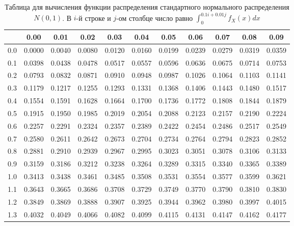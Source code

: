 \documentclass[12pt]{article}
\begin{document}
\begin{center}
  \begin{table}
    \caption{Таблица для вычисления функции распределения стандартного нормального распределения $N(0, 1)$. В $i$-й строке и $j$-ом столбце число равно $\int_0^{0.1i+ 0.01j} f_X(x) dx $}
    \begin{tabular}{|c||c|c|c|c|c|c|c|c|c|c|}
      \hline
      & 0.00 & 0.01 & 0.02 & 0.03 & 0.04 & 0.05 & 0.06 & 0.07 & 0.08 & 0.09 \\ \hline\hline
      0.0 & 0.0000 & 0.0040 & 0.0080 & 0.0120 & 0.0160 & 0.0199 & 0.0239 & 0.0279 & 0.0319 & 0.0359 \\ \hline
      0.1 & 0.0398 & 0.0438 & 0.0478 & 0.0517 & 0.0557 & 0.0596 & 0.0636 & 0.0675 & 0.0714 & 0.0753 \\ \hline
      0.2 & 0.0793 & 0.0832 & 0.0871 & 0.0910 & 0.0948 & 0.0987 & 0.1026 & 0.1064 & 0.1103 & 0.1141 \\ \hline
      0.3 & 0.1179 & 0.1217 & 0.1255 & 0.1293 & 0.1331 & 0.1368 & 0.1406 & 0.1443 & 0.1480 & 0.1517 \\ \hline
      0.4 & 0.1554 & 0.1591 & 0.1628 & 0.1664 & 0.1700 & 0.1736 & 0.1772 & 0.1808 & 0.1844 & 0.1879 \\ \hline
      0.5 & 0.1915 & 0.1950 & 0.1985 & 0.2019 & 0.2054 & 0.2088 & 0.2123 & 0.2157 & 0.2190 & 0.2224 \\ \hline
      0.6 & 0.2257 & 0.2291 & 0.2324 & 0.2357 & 0.2389 & 0.2422 & 0.2454 & 0.2486 & 0.2517 & 0.2549 \\ \hline
      0.7 & 0.2580 & 0.2611 & 0.2642 & 0.2673 & 0.2704 & 0.2734 & 0.2764 & 0.2794 & 0.2823 & 0.2852 \\ \hline
      0.8 & 0.2881 & 0.2910 & 0.2939 & 0.2967 & 0.2995 & 0.3023 & 0.3051 & 0.3078 & 0.3106 & 0.3133 \\ \hline
      0.9 & 0.3159 & 0.3186 & 0.3212 & 0.3238 & 0.3264 & 0.3289 & 0.3315 & 0.3340 & 0.3365 & 0.3389 \\ \hline
      1.0 & 0.3413 & 0.3438 & 0.3461 & 0.3485 & 0.3508 & 0.3531 & 0.3554 & 0.3577 & 0.3599 & 0.3621 \\ \hline
      1.1 & 0.3643 & 0.3665 & 0.3686 & 0.3708 & 0.3729 & 0.3749 & 0.3770 & 0.3790 & 0.3810 & 0.3830 \\ \hline
      1.2 & 0.3849 & 0.3869 & 0.3888 & 0.3907 & 0.3925 & 0.3944 & 0.3962 & 0.3980 & 0.3997 & 0.4015 \\ \hline
      1.3 & 0.4032 & 0.4049 & 0.4066 & 0.4082 & 0.4099 & 0.4115 & 0.4131 & 0.4147 & 0.4162 & 0.4177 \\ \hline

\end{tabular}
\end{table}
\end{center}
\end{document}
